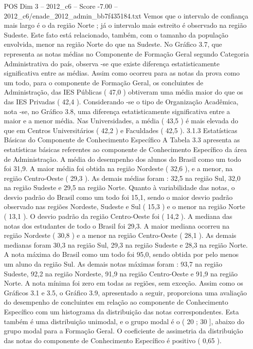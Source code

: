 \begin{textsample}{POS Dim 3 – 2012\_c6 – Score -7.00 – 2012\_c6/enade\_2012\_admin\_bb7f435184.txt}
Vemos que o intervalo de confiança mais largo é o da região Norte ; já o intervalo mais estreito é observado na região Sudeste.
Este fato está relacionado, também, com o tamanho da população envolvida, menor na região Norte do que na Sudeste.
No Gráfico 3.7, que representa as notas médias no Componente de Formação Geral segundo Categoria Administrativa do país, observa -se que existe diferença estatisticamente significativa entre as médias.
Assim como ocorreu para as notas da prova como um todo, para o componente de Formação Geral, os concluintes de Administração, das IES Públicas ( 47,0 ) obtiveram uma média maior do que os das IES Privadas ( 42,4 ).
Considerando -se o tipo de Organização Acadêmica, nota -se, no Gráfico 3.8, uma diferença estatisticamente significativa entre a maior e a menor média.
Nas Universidades, a média ( 43,5 ) é mais elevada do que em Centros Universitários ( 42,2 ) e Faculdades ( 42,5 ). 3.1.3 Estatísticas Básicas do Componente de Conhecimento Específico A Tabela 3.3 apresenta as estatísticas básicas referentes ao componente de Conhecimento Específico da área de Administração.
A média do desempenho dos alunos do Brasil como um todo foi 31,9.
A maior média foi obtida na região Nordeste ( 32,6 ), e a menor, na região Centro-Oeste ( 29,3 ).
As demais médias foram : 32,5 na região Sul, 32,0 na região Sudeste e 29,5 na região Norte.
Quanto à variabilidade das notas, o desvio padrão do Brasil como um todo foi 15,1, sendo o maior desvio padrão observado nas regiões Nordeste, Sudeste e Sul ( 15,3 ) e o menor na região Norte ( 13,1 ).
O desvio padrão da região Centro-Oeste foi ( 14,2 ).
A mediana das notas dos estudantes de todo o Brasil foi 29,3.
A maior mediana ocorreu na região Nordeste ( 30,8 ) e a menor na região Centro-Oeste ( 28,1 ).
As demais medianas foram 30,3 na região Sul, 29,3 na região Sudeste e 28,3 na região Norte.
A nota máxima do Brasil como um todo foi 95,0, sendo obtida por pelo menos um aluno da região Sul.
As demais notas máximas foram : 93,7 na região Sudeste, 92,2 na região Nordeste, 91,9 na região Centro-Oeste e 91,9 na região Norte.
A nota mínima foi zero em todas as regiões, sem exceção.
Assim como os Gráficos 3.1 e 3.5, o Gráfico 3.9, apresentado a seguir, proporciona uma avaliação do desempenho de concluintes em relação ao componente de Conhecimento Específico com um histograma da distribuição das notas correspondentes.
Esta também é uma distribuição unimodal, e o grupo modal é o ( 20 ; 30 ], abaixo do grupo modal para a Formação Geral.
O coeficiente de assimetria da distribuição das notas do componente de Conhecimento Específico é positivo ( 0,65 ).

\end{textsample}
